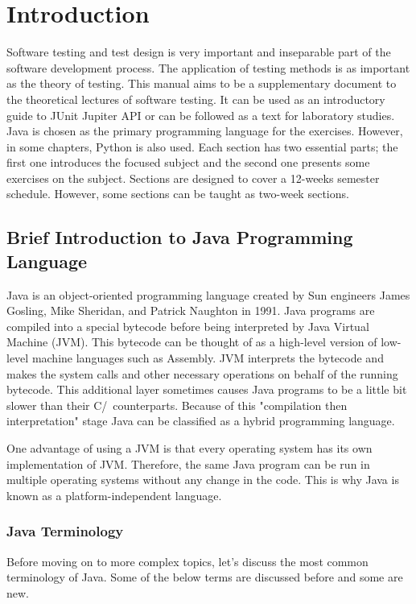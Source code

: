 \chapter{Introduction}
Software testing and test design is very important and inseparable part of the software development process. The application of testing methods is as important as the theory of testing. This manual aims to be a supplementary document to the theoretical lectures of software testing. It can be used as an introductory guide to JUnit Jupiter API or can be followed as a text for laboratory studies. Java is chosen as the primary programming language for the exercises. However, in some chapters, Python is also used. Each section has two essential parts; the first one introduces the focused subject and the second one presents some exercises on the subject. Sections are designed to cover a 12-weeks semester schedule. However, some sections can be taught as two-week sections.

\section{Brief Introduction to Java Programming Language}
Java is an object-oriented programming language created by Sun engineers James Gosling, Mike Sheridan, and Patrick Naughton in 1991. Java programs are compiled into a special bytecode before being interpreted by Java Virtual Machine (JVM). This bytecode can be thought of as a high-level version of low-level machine languages such as Assembly. JVM interprets the bytecode and makes the system calls and other necessary operations on behalf of the running bytecode. This additional layer sometimes causes Java programs to be a little bit slower than their C/\CC~counterparts. Because of this "compilation then interpretation" stage Java can be classified as a hybrid programming language. 

One advantage of using a JVM is that every operating system has its own implementation of JVM. Therefore, the same Java program can be run in multiple operating systems without any change in the code. This is why Java is known as a platform-independent language.

\subsection*{Java Terminology}
Before moving on to more complex topics, let's discuss the most common terminology of Java. Some of the below terms are discussed before and some are new.

